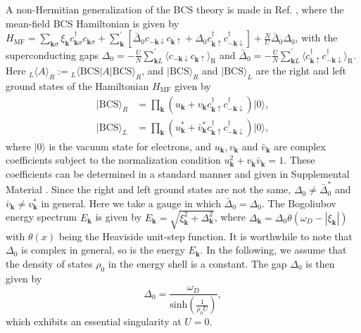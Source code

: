 \documentclass[aps,prl,twocolumn,superscriptaddress]{revtex4-1}
\begin{document}
A non-Hermitian generalization of the BCS theory is made in Ref. \cite{Yamamoto2019}, where the mean-field BCS Hamiltonian
is given by $H_{\mathrm{MF}}=\sum_{\boldsymbol{k}\sigma}\xi_{\boldsymbol{k}}c_{\boldsymbol{k}\sigma}^{\dagger}c_{\boldsymbol{k}\sigma}+\sum_{\bm{k}}^{'}[\bar{\Delta}_0c_{-\bm{k}\downarrow}c_{\bm{k}\uparrow}+\Delta_0 c_{\bm{k}\uparrow}^{\dagger}c_{-\bm{k}\downarrow}^{\dagger}]+\frac{N}{U}\bar{\Delta}_0\Delta_0$,
with the superconducting gaps $\Delta_0=-\frac{U}{N}\sum_{\boldsymbol{k}L}^{'}\langle c_{-\boldsymbol{k}\downarrow}c_{\boldsymbol{k}\uparrow}\rangle_{\mathrm{R}}$
and $\bar{\Delta}_0=-\frac{U}{N}\sum_{\boldsymbol{k}L}^{'}\langle c_{\boldsymbol{k}\uparrow}^{\dagger}c_{-\boldsymbol{k}\downarrow}^{\dagger}\rangle_{\mathrm{R}}$.
Here $_{L}\langle A\rangle_{R}:={}_{L}\langle\text{BCS}|A|\text{BCS}\rangle_{R}$,
and $|\text{BCS}\rangle_{R}$ and $|\text{BCS}\rangle_{L}$ are the
right and left ground states of the Hamiltonian $H_{\mathrm{MF}}$ given by \cite{Yamamoto2019} 
\begin{align}
|\text{BCS}\rangle_{R} & =\prod_{\bm{k}}(u_{\bm{k}}+v_{\bm{k}}c_{\boldsymbol{k}\uparrow}^{\dagger}c_{-\boldsymbol{k}\downarrow}^{\dagger})|0\rangle,\\
|\text{BCS}\rangle_{L} & =\prod_{\bm{k}}(u_{\bm{k}}^{*}+\bar{v}_{\bm{k}}^{*}c_{\boldsymbol{k}\uparrow}^{\dagger}c_{-\boldsymbol{k}\downarrow}^{\dagger})|0\rangle,
\end{align}
where $|0\rangle$ is the vacuum state for electrons, and $u_{\bm{k}},v_{\bm{k}}$
and $\bar{v}_{\bm{k}}$ are complex coefficients subject to the normalization
condition $u_{\bm{k}}^{2}+v_{\bm{k}}\bar{v}_{\bm{k}}=1$. These coefficients
can be determined in a standard manner and given in Supplemental Material
\cite{SupplementaryMaterial}. Since the right and left ground states
are not the same, $\Delta_0\neq\bar{\Delta}_0^{*}$ and $\bar{v}_{\bm{k}}\neq v_{\bm{k}}^{*}$
in general. Here we take a gauge in which $\bar{\Delta}_0=\Delta_0$. The Bogoliubov energy spectrum $E_{\bm{k}}$ is given by
\cite{Yamamoto2019} 
$E_{\bm{k}}=\sqrt{\xi_{\bm{k}}^{2}+\Delta_{\bm{k}}^{2}}$,
where $\Delta_{\bm{k}}=\Delta_0\theta(\omega_{D}-|\xi_{\bm{k}}|)$
with $\theta(x)$ being the Heaviside unit-step function. It is worthwhile
to note that $\Delta_0$ is complex in general, so is the energy
$E_{\bm{k}}$. In the following, we assume that the density of states
$\rho_{0}$ in the energy shell is a constant. The gap $\Delta_0$
is then given by 
\begin{equation}
\Delta_0=\frac{\omega_{D}}{\text{sinh}\left(\frac{1}{\rho_{0}U}\right)},\label{eq:gap}
\end{equation}
which exhibits an essential singularity at $U=0$.
\end{document}
